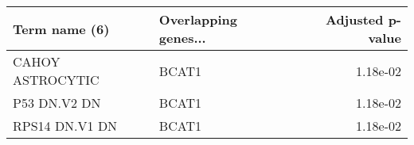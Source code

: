 \begin{tabular}{llr}
\toprule
   Term name (6) & Overlapping genes... &  Adjusted p-value \\
\midrule
CAHOY ASTROCYTIC &                BCAT1 &          1.18e-02 \\
    P53 DN.V2 DN &                BCAT1 &          1.18e-02 \\
  RPS14 DN.V1 DN &                BCAT1 &          1.18e-02 \\
\bottomrule
\end{tabular}

